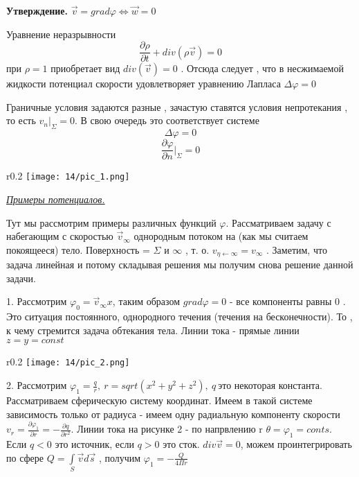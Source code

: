 \textbf{Утверждение.} $\overrightarrow{v} = grad \varphi \Leftrightarrow \overrightarrow{w} = 0$

\newpage
Уравнение неразрывности
$$
  \frac{\partial \rho}{\partial t} + div(\rho \overrightarrow{v}) = 0
$$
при $\rho = 1$  приобретает вид $div( \overrightarrow{v}) = 0 $ . Отсюда следует , что в несжимаемой жидкости потенциал скорости удовлетворяет уравнению Лапласа $\Delta \varphi = 0$

Граничные условия задаются разные , зачастую ставятся условия непротекания , то есть $v_n |_{\Sigma} = 0$. В свою очередь это соответствует системе
$$
  \Delta \varphi = 0
$$
$$
  \frac{\partial \varphi}{\partial n} |_{\Sigma} = 0
$$

\begin{wrapfigure}{r}{0.2\textwidth}
  \texttt{[image: 14/pic\_1.png]}
  \caption{\label{ris:image14.1}}
\end{wrapfigure}

\begin{center}
  \textit{\underline{Примеры потенциалов.}}
\end{center}

Тут мы рассмотрим примеры различных функций $\varphi $. Рассматриваем задачу с набегающим с скоростью $\overrightarrow{v}_{\infty}$ однородным потоком на (как мы считаем покоящееся) тело.  Поверхность = $\Sigma$ и $\infty$  , т. о. $v_{\eta \leftarrow \infty} = v_\infty$ . Заметим, что задача линейная и потому складывая решения мы получим снова решение данной задачи.

1. Рассмотрим $\varphi_0 = \overrightarrow{v}_{\infty} x$, таким образом $grad \varphi = 0$ - все компоненты равны 0 . Это ситуация постоянного, однородного течения (течения на бесконечности). То , к чему стремится задача обтекания тела. Линии тока - прямые линии $z=y=const$

\begin{wrapfigure}{r}{0.2\textwidth}
  \texttt{[image: 14/pic\_2.png]}
  \caption{\label{ris:image14.2}}
\end{wrapfigure}

2. Рассмотрим $\varphi_1 = \frac{q}{r}, \ r = sqrt(x^2+y^2+z^2), \ q \ \text{это некоторая константа}$. Рассматриваем сферическую систему координат. Имеем в такой системе зависимость только от радиуса - имеем одну радиальную компоненту скорости $v_r = \frac {\partial \varphi_1 } {\partial r}= -\frac{\partial q}{\partial r^2}.$ Линии тока  на рисунке  2 - по напрвлению r $\theta = \varphi_1 = conts$. Если $q < 0$ это источник, если $q > 0$ это сток. $div \overrightarrow{v} = 0$, можем проинтегрировать по  сфере $Q = \int\limits_{S} \overrightarrow{v} d \overrightarrow{s} $ , получим $\varphi_1 =- \frac{Q}{4\Pi r}$

